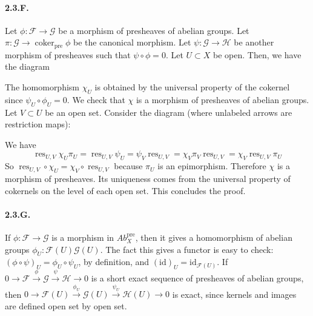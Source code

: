 \documentclass{article}
\newcommand{\id}{\mathrm{id}}
\newcommand{\pre}{\mathrm{pre}}
\newcommand{\Ab}{\mathit{Ab}}
\DeclareMathOperator{\coker}{coker}
\DeclareMathOperator{\res}{res}
\newcommand{\Fsheaf}{\mathscr{F}}
\newcommand{\Gsheaf}{\mathscr{G}}
\newcommand{\Hsheaf}{\mathscr{H}}
\begin{document}
\paragraph{2.3.F.} Let $\phi : \Fsheaf \to \Gsheaf$ be a morphism of presheaves of abelian groups. Let $\pi : \Gsheaf \to \coker_\pre \phi$ be the canonical morphism. Let $\psi : \Gsheaf \to \Hsheaf$ be another morphism of presheaves such that $\psi \circ \phi = 0$. Let $U \subset X$ be open. Then, we have the diagram
\begin{center}
\end{center}
The homomorphism $\chi_U$ is obtained by the universal property of the cokernel since $\psi_U \circ \phi_U = 0$. We check that $\chi$ is a morphism of presheaves of abelian groups. Let $V \subset U$ be an open set. Consider the diagram (where unlabeled arrows are restriction maps):
\begin{center}
\end{center}
We have
\[\res_{U,V}\chi_U\pi_U = \res_{U,V} \psi_U = \psi_V  \res_{U,V} = \chi_V  \pi_V \res_{U,V} = \chi_V\res_{U,V}\pi_U \]
So $\res_{U,V} \circ \chi_U = \chi_V \circ \res_{U,V}$ because $\pi_U$ is an epimorphism. Therefore $\chi$ is a morphism of presheaves. Its uniqueness comes from the universal property of cokernels on the level of each open set. This concludes the proof.

\paragraph{2.3.G.} If $\phi : \Fsheaf \to \Gsheaf$ is a morphism in $\Ab^\pre_X$, then it gives a homomorphism of abelian groups $\phi_U : \Fsheaf(U) \Gsheaf(U)$. The fact this gives a functor is easy to check: $(\phi \circ \psi)_U = \phi_U \circ \psi_U$, by definition, and $(\id)_U = \id_{\Fsheaf(U)}$. If $0 \to \Fsheaf \xrightarrow{\phi} \Gsheaf \xrightarrow{\psi} \Hsheaf \to 0$ is a short exact sequence of presheaves of abelian groups, then $0 \to \Fsheaf(U) \xrightarrow{\phi_U} \Gsheaf(U) \xrightarrow{\psi_U} \Hsheaf(U) \to 0$ is exact, since kernels and images are defined open set by open set.
\end{document}
